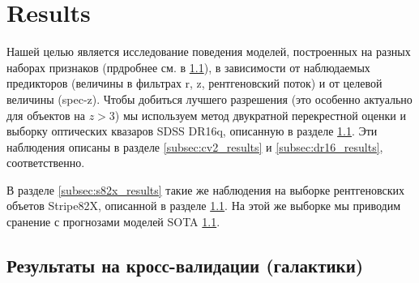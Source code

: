 \documentclass[fleqn,usenatbib]{mnras}
\begin{document}

\section{Results}
Нашей целью является исследование поведения моделей, построенных на разных наборах признаков (прдробнее см. в \ref{}), в зависимости от наблюдаемых предикторов (величины в фильтрах r, z, рентгеновский поток) и от целевой величины (spec-z). Чтобы добиться лучшего разрешения (это особенно актуально для объектов на $z > 3$) мы используем метод двукратной перекрестной оценки и выборку оптических квазаров SDSS DR16q, описанную в разделе \ref{}. Эти наблюдения описаны в разделе \ref{subsec:cv2_results} и \ref{subsec:dr16_results}, соответственно.

В разделе \ref{subsec:s82x_results} такие же наблюдения на выборке рентгеновских объетов Stripe82X, описанной в разделе \ref{}. На этой же выборке мы приводим сранение с прогнозами моделей SOTA \ref{}.

\subsection{Результаты на кросс-валидации (галактики)}


\end{document}
